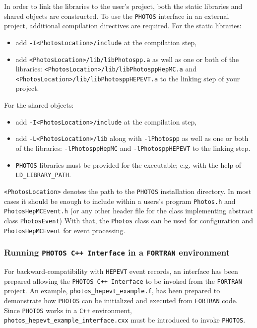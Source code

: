 \documentclass[]{Photos_interface_design}
\begin{document}
In order to link the libraries to the user's project, both the static libraries and shared objects are
constructed. To use the {\tt PHOTOS} interface in an external project, additional 
compilation directives are required. For the static libraries:
\begin{itemize}
  \item add {\tt -I<PhotosLocation>/include} at the compilation step,
  \item add {\tt <PhotosLocation>/lib/libPhotospp.a} as well as one or both of the libraries: 
            {\tt <PhotosLocation>/lib/libPhotosppHepMC.a} and
            {\tt <PhotosLocation>/lib/libPhotosppHEPEVT.a} to the linking step of your project.
\end{itemize}
For the shared objects:
\begin{itemize}
  \item add {\tt -I<PhotosLocation>/include} at the compilation step,
  \item add {\tt -L<PhotosLocation>/lib} along with {\tt -lPhotospp} as well as one or both of the libraries:
            {\tt -lPhotosppHepMC} and {\tt -lPhotosppHEPEVT} to the linking step.
  \item  {\tt PHOTOS} libraries must be provided for the executable; e.g. with the help of {\tt LD\_LIBRARY\_PATH}.
\end{itemize}
{\tt <PhotosLocation>} denotes the path to the {\tt PHOTOS} installation directory.
In most cases it should be enough to include within a users's program {\tt Photos.h} and {\tt PhotosHepMCEvent.h} (or any other header file for the class implementing abstract class {\tt PhotosEvent})
With that, the {\tt Photos} class can be used for configuration and {\tt PhotosHepMCEvent}
for event processing.

\subsubsection{Running {\tt PHOTOS C++ Interface} in a {\tt FORTRAN} environment}

For backward-compatibility with {\tt HEPEVT} event records, an interface has been prepared
allowing the {\tt PHOTOS C++ Interface} to be invoked from the {\tt FORTRAN} project. An example,
{\tt photos\_hepevt\_example.f}, has been prepared to demonstrate how {\tt PHOTOS} can be
initialized and executed from {\tt FORTRAN} code. Since {\tt PHOTOS} works in a {\tt C++} environment,  \\
{\tt photos\_hepevt\_example\_interface.cxx} must be introduced to invoke {\tt PHOTOS}.
\end{document}
